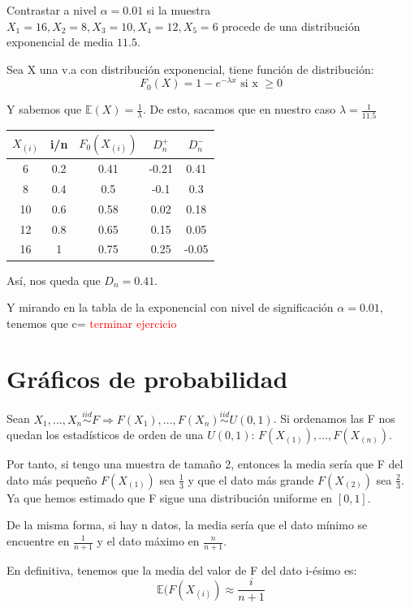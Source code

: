 \documentclass[palatino,nochap]{apuntes}
\begin{document}
\begin{example}
Contrastar a nivel $\alpha=0.01$ si la muestra $X_1=16, X_2=8, X_3=10, X_4=12, X_5=6$ procede de una distribución exponencial de media $11.5$.

Sea X una v.a con distribución exponencial, tiene función de distribución:
$$F_0(X) = 1-e^{-\lambda x} \text{ si x } \geq 0$$

Y sabemos que $\mathbb{E}(X)=\frac{1}{\lambda}$. De esto, sacamos que en nuestro caso $\lambda = \frac{1}{11.5}$ 

\begin{tabular}{|c|c|c|c|c|}
\hline
 $X_{(i)}$ & i/n & $F_0(X_{(i)})$ & $D_n^+$ & $D_n^-$ \\
\hline
6 & 0.2 & 0.41 & -0.21 & 0.41 \\
\hline
8 & 0.4 & 0.5 & -0.1 & 0.3 \\
\hline
10 & 0.6 & 0.58 & 0.02 & 0.18 \\
\hline
12 & 0.8 & 0.65 & 0.15 & 0.05 \\
\hline
16 & 1 & 0.75 & 0.25 & -0.05 \\
\hline
\end{tabular}

Así, nos queda que $D_n = 0.41$.

Y mirando en la tabla de la exponencial con nivel de significación $\alpha = 0.01$, tenemos que c= \textcolor{red}{terminar ejercicio}

\end{example}

\section{Gráficos de probabilidad}
Sean $X_1,...,X_n \stackrel{iid}{\sim} F \Rightarrow F(X_1),...,F(X_n) \stackrel{iid}{\sim} U(0,1)$. Si ordenamos las F nos quedan los estadísticos de orden de una $U(0,1)$: $F(X_{(1)}),...,F(X_{(n)})$.

Por tanto, si tengo una muestra de tamaño 2, entonces la media sería que F del dato más pequeño $F(X_{(1)})$ sea $\frac{1}{3}$ y que el dato más grande $F(X_{(2)})$ sea $\frac{2}{3}$. Ya que hemos estimado que F sigue una distribución uniforme en $[0,1]$.

De la misma forma, si hay n datos, la media sería que el dato mínimo se encuentre en $\frac{1}{n+1}$ y el dato máximo en $\frac{n}{n+1}$.

En definitiva, tenemos que la media del valor de F del dato i-ésimo es:
$$\mathbb{E}(F(X_{(i)}) \approx \frac{i}{n+1}$$
\end{document}

